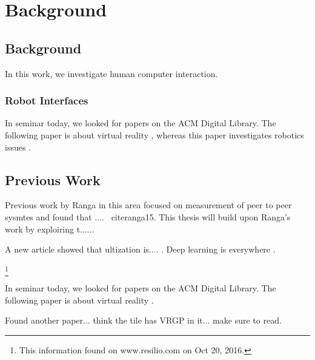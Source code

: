 \chapter{Background}
\label{chap:background}

\section{Background}

In this work, we investigate human computer interaction. 

\subsection{Robot Interfaces}

In seminar today, we looked for papers on the ACM Digital Library. The
following paper is about virtual reality \parencite{Kreylos:2006:ESW:1128923.1128948}, whereas this paper investigates robotics issues \parencite{Drascic89}.

\section{Previous Work}

Previous work by Ranga in this area focused on measurement of peer to peer sysmtes and found that .... ~cite{ranga15}. This thesis will build upon Ranga's work by exploiring t......

A new article showed that ultization is.... \parencite{Abbasi:2013:DBS:2507924.2507961}. Deep learning is everywhere \parencite{Tang:2019:MTR:3365594.3358696}.

\cite{website1}

\footnote{This information found on www.resilio.com on Oct 20, 2016.}

In seminar today, we looked for papers on the ACM Digital Library. The
following paper is about virtual reality
\parencite{Kreylos:2006:ESW:1128923.1128948}.

Found another paper... think the tile has VRGP in it... make sure to read.





